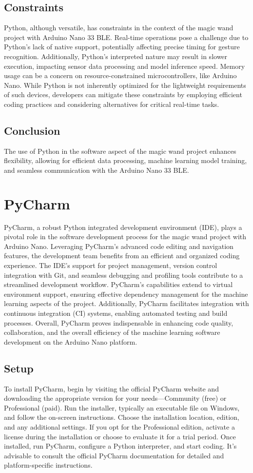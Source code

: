 \subsection{Constraints}
Python, although versatile, has constraints in the context of the magic wand project with Arduino Nano 33 BLE. Real-time operations pose a challenge due to Python's lack of native support, potentially affecting precise timing for gesture recognition. Additionally, Python's interpreted nature may result in slower execution, impacting sensor data processing and model inference speed. Memory usage can be a concern on resource-constrained microcontrollers, like Arduino Nano. While Python is not inherently optimized for the lightweight requirements of such devices, developers can mitigate these constraints by employing efficient coding practices and considering alternatives for critical real-time tasks. 


\subsection{Conclusion}
The use of Python in the software aspect of the magic wand project enhances flexibility, allowing for efficient data processing, machine learning model training, and seamless communication with the Arduino Nano 33 BLE.


\section{PyCharm}
\label{Pycharm}
PyCharm, a robust Python integrated development environment (IDE), plays a pivotal role in the software development process for the magic wand project with Arduino Nano. Leveraging PyCharm's advanced code editing and navigation features, the development team benefits from an efficient and organized coding experience. The IDE's support for project management, version control integration with Git, and seamless debugging and profiling tools contribute to a streamlined development workflow. PyCharm's capabilities extend to virtual environment support, ensuring effective dependency management for the machine learning aspects of the project. Additionally, PyCharm facilitates integration with continuous integration (CI) systems, enabling automated testing and build processes. Overall, PyCharm proves indispensable in enhancing code quality, collaboration, and the overall efficiency of the machine learning software development on the Arduino Nano platform.
\subsection{Setup}
To install PyCharm, begin by visiting the official PyCharm website and downloading the appropriate version for your needs—Community (free) or Professional (paid). Run the installer, typically an executable file on Windows, and follow the on-screen instructions. Choose the installation location, edition, and any additional settings. If you opt for the Professional edition, activate a license during the installation or choose to evaluate it for a trial period. Once installed, run PyCharm, configure a Python interpreter, and start coding. It's advisable to consult the official PyCharm documentation for detailed and platform-specific instructions.
